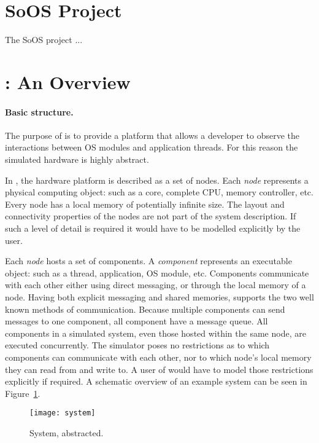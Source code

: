 \section{SoOS Project}
\label{sec:soos-project}

The SoOS project  \cite{soos}...

\section{\soosim: An Overview}
\label{sec:soosim-an-overview}

\paragraph{Basic structure.} 
The purpose of \soosim is to provide a platform that allows a developer to observe the interactions between OS modules and application threads.
For this reason the simulated hardware is highly abstract.

In \soosim, the hardware platform is described as a set of nodes.
Each \emph{node} represents a physical computing object: such as a core, complete CPU, memory controller, etc.
Every node has a local memory of potentially infinite size.
The layout and connectivity properties of the nodes are not part of the system description.
If such a level of detail is required it would have to be modelled explicitly by the user.

Each \emph{node} hosts a set of components.
A \emph{component} represents an executable object: such as a thread, application, OS module, etc.
Components communicate with each other either using direct messaging, or through the local memory of a node.
Having both explicit messaging and shared memories, \soosim supports the two well known methods of communication.
Because multiple components can send messages to one component, all component have a message queue.
All components in a simulated system, even those hosted within the same node, are executed concurrently.
The simulator poses no restrictions as to which components can communicate with each other, nor to which node's local memory they can read from and write to.
A user of \soosim would have to model those restrictions explicitly if required.
A schematic overview of an example system can be seen in Figure~\ref{fig:system}.

\begin{figure}
\centering
%
\texttt{[image: system]}
\caption{System, abstracted.}
\label{fig:system}
\end{figure}

